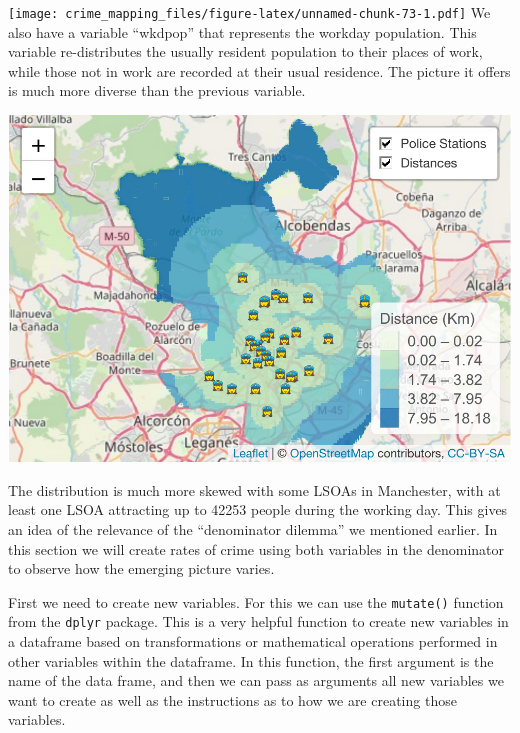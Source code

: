 \documentclass[
]{book}
\newenvironment{Shaded}{\begin{snugshade}}{\end{snugshade}}
\newcommand{\FunctionTok}[1]{\textcolor[rgb]{0.00,0.00,0.00}{#1}}
\newcommand{\NormalTok}[1]{#1}
\newcommand{\SpecialCharTok}[1]{\textcolor[rgb]{0.00,0.00,0.00}{#1}}
\begin{document}
\begin{Shaded}
\end{Shaded}

\texttt{[image: crime\_mapping\_files/figure-latex/unnamed-chunk-73-1.pdf]}
We also have a variable ``wkdpop'' that represents the workday population. This variable re-distributes the usually resident population to their places of work, while those not in work are recorded at their usual residence. The picture it offers is much more diverse than the previous variable.

\begin{Shaded}
\end{Shaded}

\includegraphics{crime_mapping_files/figure-latex/unnamed-chunk-74-1.pdf}

The distribution is much more skewed with some LSOAs in Manchester, with at least one LSOA attracting up to 42253 people during the working day. This gives an idea of the relevance of the ``denominator dilemma'' we mentioned earlier. In this section we will create rates of crime using both variables in the denominator to observe how the emerging picture varies.

First we need to create new variables. For this we can use the \texttt{mutate()} function from the \texttt{dplyr} package. This is a very helpful function to create new variables in a dataframe based on transformations or mathematical operations performed in other variables within the dataframe. In this function, the first argument is the name of the data frame, and then we can pass as arguments all new variables we want to create as well as the instructions as to how we are creating those variables.
\end{document}
